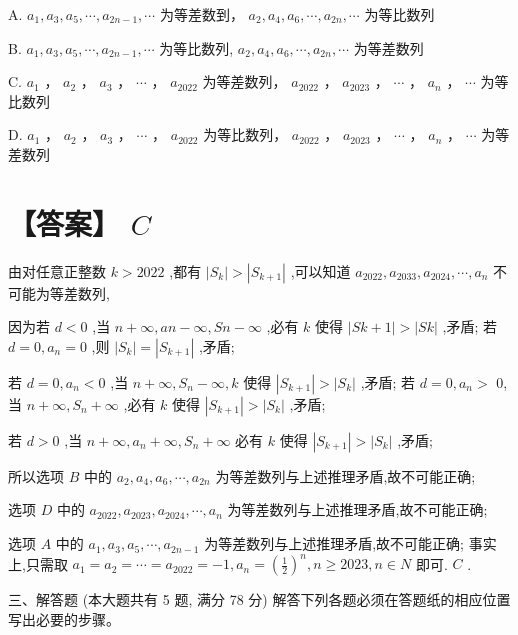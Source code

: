 \documentclass[10pt]{article}
\begin{document}
A. \({a}_{1},{a}_{3},{a}_{5},\cdots ,{a}_{{2n} - 1},\cdots\) 为等差数到， \({a}_{2},{a}_{4},{a}_{6},\cdots ,{a}_{2n},\cdots\) 为等比数列

B. \({a}_{1},{a}_{3},{a}_{5},\cdots ,{a}_{{2n} - 1},\cdots\) 为等比数列, \({a}_{2},{a}_{4},{a}_{6},\cdots ,{a}_{2n},\cdots\) 为等差数列

C. \({a}_{1}\) ， \({a}_{2}\) ， \({a}_{3}\) ， \(\cdots\) ， \({a}_{2022}\) 为等差数列， \({a}_{2022}\) ， \({a}_{2023}\) ， \(\cdots\) ， \({a}_{n}\) ， \(\cdots\) 为等比数列

D. \({a}_{1}\) ， \({a}_{2}\) ， \({a}_{3}\) ， \(\cdots\) ， \({a}_{2022}\) 为等比数列， \({a}_{2022}\) ， \({a}_{2023}\) ， \(\cdots\) ， \({a}_{n}\) ， \(\cdots\) 为等差数列

\section*{【答案】 \(C\)}

由对任意正整数 \(k > {2022}\) ,都有 \(\left| {S}_{k}\right|  > \left| {S}_{k + 1}\right|\) ,可以知道 \({a}_{2022},{a}_{2033},{a}_{2024},\cdots ,{a}_{n}\) 不可能为等差数列,

因为若 \(d < 0\) ,当 \(n + \infty ,{an} - \infty ,{Sn} - \infty\) ,必有 \(k\) 使得 \(\left| {{Sk} + 1}\right|  > \left| {Sk}\right|\) ,矛盾; 若 \(d = 0,{a}_{n} = 0\) ,则 \(\left| {S}_{k}\right|  = \left| {S}_{k + 1}\right|\) ,矛盾;

若 \(d = 0,{a}_{n} < 0\) ,当 \(n + \infty ,{S}_{n} - \infty ,k\) 使得 \(\left| {S}_{k + 1}\right|  > \left| {S}_{k}\right|\) ,矛盾; 若 \(d = 0,{a}_{n} >\) 0,当 \(n + \infty ,{S}_{n} + \infty\) ,必有 \(k\) 使得 \(\left| {S}_{k + 1}\right|  > \left| {S}_{k}\right|\) ,矛盾;

若 \(d > 0\) ,当 \(n + \infty ,{a}_{n} + \infty ,{S}_{n} + \infty\) 必有 \(k\) 使得 \(\left| {S}_{k + 1}\right|  > \left| {S}_{k}\right|\) ,矛盾;

所以选项 \(B\) 中的 \({a}_{2},{a}_{4},{a}_{6},\cdots ,{a}_{2n}\) 为等差数列与上述推理矛盾,故不可能正确;

选项 \(D\) 中的 \({a}_{2022},{a}_{2023},{a}_{2024},\cdots ,{a}_{n}\) 为等差数列与上述推理矛盾,故不可能正确;

选项 \(A\) 中的 \({a}_{1},{a}_{3},{a}_{5},\cdots ,{a}_{{2n} - 1}\) 为等差数列与上述推理矛盾,故不可能正确; 事实上,只需取 \({a}_{1} = {a}_{2} = \cdots  = {a}_{2022} =  - 1,{a}_{n} = {\left( \frac{1}{2}\right) }^{n},n \geq  {2023},n \in  N\) 即可. \(C\) .

三、解答题 (本大题共有 5 题, 满分 78 分) 解答下列各题必须在答题纸的相应位置写出必要的步骤。
\end{document}
